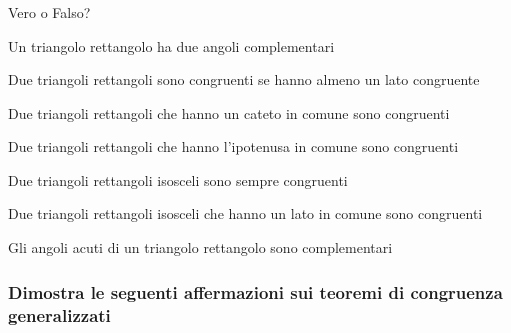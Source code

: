 
\subsubsection*{}

\begin{esercizio}
\label{ese:3.52}
Vero o Falso?
\begin{enumeratea}
\item Un triangolo rettangolo ha due angoli 
complementari\hfill\boxV\quad\boxF
\item Due triangoli rettangoli sono congruenti se hanno almeno un 
lato congruente\hfill\boxV\quad\boxF
\item Due triangoli rettangoli che hanno un cateto in comune sono 
congruenti\hfill\boxV\quad\boxF
\item Due triangoli rettangoli che hanno l'ipotenusa in comune sono 
congruenti\hfill\boxV\quad\boxF
\item Due triangoli rettangoli isosceli sono sempre 
congruenti\hfill\boxV\quad\boxF
\item Due triangoli rettangoli isosceli che hanno un lato in comune 
sono congruenti\hfill\boxV\quad\boxF
\item Gli angoli acuti di un triangolo rettangolo sono 
complementari\hfill\boxV\quad\boxF
\end{enumeratea}
\end{esercizio}

\newpage %

\subsubsection*{Dimostra le seguenti affermazioni sui teoremi di 
congruenza generalizzati}

\vspace{-6pt}

